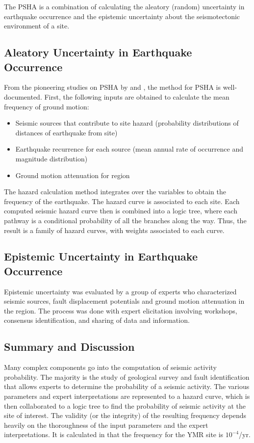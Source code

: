 \documentclass[12pt]{article}
\begin{document}
The \gls{PSHA} is a combination of 
calculating the aleatory (random) uncertainty in
earthquake occurrence and the epistemic uncertainty
about the seismotectonic environment of a site.

\subsection{Aleatory Uncertainty in Earthquake Occurrence}

From the pioneering studies on \gls{PSHA} by \cite{mcguire_fortran_1976}
and \cite{cornell_engineering_1968}, the method for \gls{PSHA} 
is well-documented. First, the following inputs are obtained to calculate
the mean frequency of ground motion:

\begin{itemize}
    \item Seismic sources that contribute to site hazard 
    (probability distributions of distances of earthquake from site)
    \item Earthquake recurrence for each source 
    (mean annual rate of occurrence and magnitude distribution)
    \item Ground motion attenuation for region
\end{itemize}


The hazard calculation method integrates over the variables
to obtain the frequency of the earthquake. The hazard curve
is associated to each site. Each computed seismic hazard curve then
is combined into a logic tree, where each pathway is a conditional
probability of all the branches along the way. Thus, the result
is a family of hazard curves, with weights associated to each curve.



\subsection{Epistemic Uncertainty in Earthquake Occurrence}

Epistemic uncertainty was evaluated by a group of experts
who characterized seismic sources, fault displacement potentials
and ground motion attenuation in the region. The process 
was done with expert elicitation involving workshops,
consensus identification, and sharing of data and information.


\subsection{Summary and Discussion}
Many complex components go into the computation of 
seismic activity probability. The majority is the study
of geological survey and fault identification that allows
experts to determine the probability of a seismic activity.
The various parameters and expert interpretations are 
represented to a hazard curve, which is then collaborated
to a logic tree to find the probability of seismic activity
at the site of interest.
The validity (or the integrity) of the resulting frequency 
depends heavily on the thoroughness of the input parameters
and the expert interpretations. It is calculated in \cite{stepp_probabilistic_2001}
that the frequency for the \gls{YMR} site is $10^{-4}$/yr.
\end{document}
